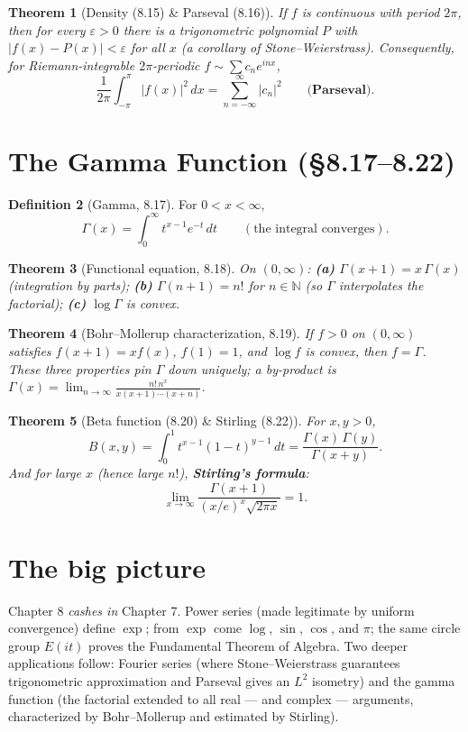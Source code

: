 \documentclass[11pt]{article}
\theoremstyle{definition}
\newtheorem{definition}{Definition}[section]
\theoremstyle{plain}
\newtheorem{theorem}[definition]{Theorem}
\newcommand{\N}{\mathbb{N}}
\newcommand{\abs}[1]{\left\lvert #1 \right\rvert}
\newcommand{\Gam}{\Gamma}
\renewcommand{\to}{\longrightarrow}
\begin{document}
\begin{theorem}[Density (8.15) \& Parseval (8.16)]
If $f$ is continuous with period $2\pi$, then for every $\varepsilon>0$ there is
a trigonometric polynomial $P$ with $\abs{f(x)-P(x)}<\varepsilon$ for all $x$
(a corollary of Stone--Weierstrass). Consequently, for Riemann-integrable
$2\pi$-periodic $f\sim\sum c_n e^{inx}$,
\[
   \frac{1}{2\pi}\int_{-\pi}^{\pi}\abs{f(x)}^2\,dx
   =\sum_{n=-\infty}^{\infty}\abs{c_n}^2
   \qquad\textbf{(Parseval).}
\]
\end{theorem}

\section{The Gamma Function (\S8.17--8.22)}

\begin{definition}[Gamma, 8.17]
For $0<x<\infty$,
\[
   \Gam(x)=\int_0^{\infty} t^{x-1}e^{-t}\,dt
   \qquad(\text{the integral converges}).
\]
\end{definition}

\begin{theorem}[Functional equation, 8.18]
On $(0,\infty)$:
\textbf{(a)} $\Gam(x+1)=x\,\Gam(x)$ (integration by parts);
\textbf{(b)} $\Gam(n+1)=n!$ for $n\in\N$ (so $\Gam$ interpolates the factorial);
\textbf{(c)} $\log\Gam$ is convex.
\end{theorem}

\begin{theorem}[Bohr--Mollerup characterization, 8.19]
If $f>0$ on $(0,\infty)$ satisfies $f(x+1)=xf(x)$, $f(1)=1$, and $\log f$ is
convex, then $f=\Gam$. \emph{These three properties pin $\Gam$ down uniquely}; a
by-product is
$\displaystyle\Gam(x)=\lim_{n\to\infty}\frac{n!\,n^x}{x(x+1)\cdots(x+n)}$.
\end{theorem}

\begin{theorem}[Beta function (8.20) \& Stirling (8.22)]
For $x,y>0$,
\[
   B(x,y)=\int_0^1 t^{x-1}(1-t)^{y-1}\,dt=\frac{\Gam(x)\,\Gam(y)}{\Gam(x+y)} .
\]
And for large $x$ (hence large $n!$), \textbf{Stirling's formula}:
\[
   \lim_{x\to\infty}\frac{\Gam(x+1)}{(x/e)^x\sqrt{2\pi x}}=1 .
\]
\end{theorem}

\section*{The big picture}
Chapter 8 \emph{cashes in} Chapter 7. Power series (made legitimate by uniform
convergence) define $\exp$; from $\exp$ come $\log$, $\sin$, $\cos$, and $\pi$;
the same circle group $E(it)$ proves the Fundamental Theorem of Algebra. Two
deeper applications follow: Fourier series (where Stone--Weierstrass guarantees
trigonometric approximation and Parseval gives an $L^2$ isometry) and the gamma
function (the factorial extended to all real --- and complex --- arguments,
characterized by Bohr--Mollerup and estimated by Stirling).
\end{document}
